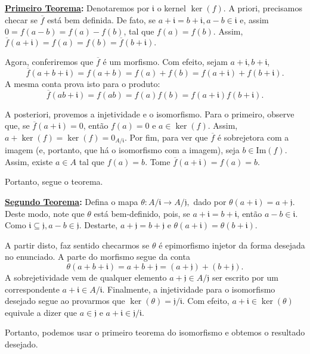 \documentclass[AlgebraII/algebraII_notes.tex]{subfiles}
\begin{document}
\begin{proof*}
	\textbf{\underline{Primeiro Teorema}:} Denotaremos por \(\mathfrak{i}\) o kernel \(\ker{(f)}.\)
	A priori, precisamos checar se \(\overline{f}\) está bem definida. De fato, se \(a+\mathfrak{i}=b+\mathfrak{i}, a-b\in \mathfrak{i}\) e, assim
	\(0 = f(a-b) = f(a)-f(b)\), tal que \(f(a) = f(b).\) Assim, \(\overline{f}(a+\mathfrak{i}) = f(a) = f(b) = \overline{f}(b+\mathfrak{i}).\)

	Agora, conferiremos que \(\overline{f}\) é um morfismo. Com efeito, sejam \(a+\mathfrak{i}, b+\mathfrak{i}\),
	\[
		\overline{f}(a+b+\mathfrak{i}) = f(a+b) = f(a)+f(b) = f(a+\mathfrak{i})+f(b+\mathfrak{i}).
	\]
	A mesma conta prova isto para o produto:
	\[
		\overline{f}(ab+\mathfrak{i}) = f(ab) = f(a)f(b) = f(a+\mathfrak{i})f(b+\mathfrak{i}).
	\]

	A posteriori, provemos a injetividade e o isomorfismo. Para o primeiro, observe que, se \(\overline{f}(a+\mathfrak{i}) = 0\), então
	\(f(a) = 0\) e \(a\in\ker{(f)}\). Assim, \(a+\ker{(f)} = \ker{(f)} = 0_{A/\mathfrak{i}}\). Por fim,
	para ver que \(\overline{f}\) é sobrejetora com a imagem (e, portanto, que há o isomorfismo com a imagem),
	seja \(b\in \mathrm{Im}(f).\) Assim, existe \(a\in A\) tal que \(f(a) = b\). Tome \(\overline{f}(a+\mathfrak{i}) = f(a)=b.\)

	Portanto, segue o teorema.

	\textbf{\underline{Segundo Teorema}:} Defina o mapa \(\theta :A/\mathfrak{i}\rightarrow A/\mathfrak{j},\) dado por \(\theta(a+\mathfrak{i}) = a + \mathfrak{j}.\)
	Deste modo, note que \(\theta \) está bem-definido, pois, se \(a+\mathfrak{i} = b+\mathfrak{i}\), então \(a-b\in \mathfrak{i}\). Como
	\(\mathfrak{i}\subseteq \mathfrak{j}, a-b\in \mathfrak{j}.\) Destarte, \(a+\mathfrak{j} = b+\mathfrak{j}\) e \(\theta(a+\mathfrak{i}) = \theta (b+\mathfrak{i}).\)

	A partir disto, faz sentido checarmos se \(\theta \) é epimorfismo injetor da forma desejada no enunciado. A parte do morfismo segue da conta
	\[
		\theta (a+b+\mathfrak{i}) = a + b + \mathfrak{j} = (a+\mathfrak{j}) + (b+\mathfrak{j}).
	\]
	A sobrejetividade vem de qualquer elemento \(a+\mathfrak{j}\in A/\mathfrak{j}\) ser escrito por um correspondente \(a+\mathfrak{i}\in A/\mathfrak{i}\).
	Finalmente, a injetividade para o isomorfismo desejado segue ao provarmos que \(\ker{(\theta )}=\mathfrak{j}/\mathfrak{i}.\) Com efeito,
	\(a+\mathfrak{i}\in\ker{(\theta )}\) equivale a dizer que \(a\in \mathfrak{j}\) e \(a+\mathfrak{i}\in \mathfrak{j}/\mathfrak{i}\).

	Portanto, podemos usar o primeiro teorema do isomorfismo e obtemos o resultado desejado. \qedsymbol
\end{proof*}
\end{document}
